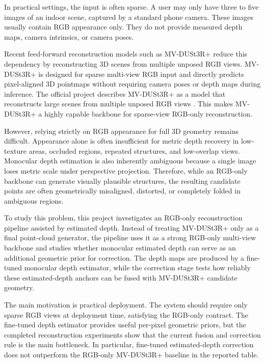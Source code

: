 \documentclass[12pt,a4paper]{article}
\newcommand{\mvdp}{MV-DUSt3R+}
\begin{document}
In practical settings, the input is often sparse. A user may only have three to five images of an indoor scene, captured by a standard phone camera. These images usually contain RGB appearance only. They do not provide measured depth maps, camera intrinsics, or camera poses. 

Recent feed-forward reconstruction models such as \mvdp{} reduce this dependency by reconstructing 3D scenes from multiple unposed RGB views. \mvdp{} is designed for sparse multi-view RGB input and directly predicts pixel-aligned 3D pointmaps without requiring camera poses or depth maps during inference. The official project describes \mvdp{} as a model that reconstructs large scenes from multiple unposed RGB views \cite{mvdust3r_project,mvdust3r_paper}. This makes \mvdp{} a highly capable backbone for sparse-view RGB-only reconstruction.

However, relying strictly on RGB appearance for full 3D geometry remains difficult. Appearance alone is often insufficient for metric depth recovery in low-texture areas, occluded regions, repeated structures, and low-overlap views. Monocular depth estimation is also inherently ambiguous because a single image loses metric scale under perspective projection. Therefore, while an RGB-only backbone can generate visually plausible structures, the resulting candidate points are often geometrically misaligned, distorted, or completely folded in ambiguous regions.

To study this problem, this project investigates an RGB-only reconstruction pipeline assisted by estimated depth. Instead of treating \mvdp{} only as a final point-cloud generator, the pipeline uses it as a strong RGB-only multi-view backbone and studies whether monocular estimated depth can serve as an additional geometric prior for correction. The depth maps are produced by a fine-tuned monocular depth estimator, while the correction stage tests how reliably these estimated-depth anchors can be fused with \mvdp{} candidate geometry.

The main motivation is practical deployment. The system should require only sparse RGB views at deployment time, satisfying the RGB-only contract. The fine-tuned depth estimator provides useful per-pixel geometric priors, but the completed reconstruction experiments show that the current fusion and correction rule is the main bottleneck. In particular, fine-tuned estimated-depth correction does not outperform the RGB-only \mvdp{} baseline in the reported table.
\end{document}
